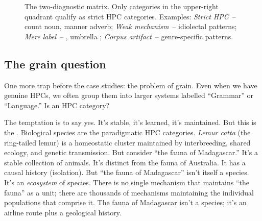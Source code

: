 \begin{figure}[t]
\centering
{}
\caption{The two-diagnostic matrix. Only categories in the upper-right quadrant qualify as strict HPC categories. Examples: \emph{Strict HPC}~-- count noun, manner adverb; \emph{Weak mechanism}~-- idiolectal patterns; \emph{Mere label}~-- , umbrella ; \emph{Corpus artifact}~-- genre-specific patterns.}
\label{fig:diagnostic-matrix}
\end{figure}

\subsection{The grain question}
\label{sec:8:grain-question}

One more trap before the case studies: the problem of grain. Even when we have genuine HPCs, we often group them into larger systems labelled \enquote{Grammar} or \enquote{Language.} Is  an HPC category?

The temptation is to say yes. It's stable, it's learned, it's maintained. But this is the . Biological species are the paradigmatic HPC categories. \textit{Lemur catta} (the ring-tailed lemur) is a homeostatic cluster maintained by interbreeding, shared ecology, and genetic transmission. But consider \enquote{the fauna of Madagascar.} It's a stable collection of animals. It's distinct from the fauna of Australia. It has a causal history (isolation). But \enquote{the fauna of Madagascar} isn't itself a species. It's an \emph{ecosystem} of species. There is no single mechanism that maintains \enquote{the fauna} as a unit; there are thousands of mechanisms maintaining the individual populations that comprise it. The fauna of Madagascar isn't a species; it's an airline route plus a geological history.

